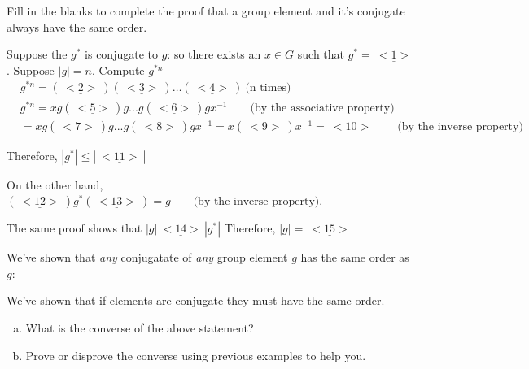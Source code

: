 \begin{exercise}\label{exercise:actions:Conj15b}
Fill in the blanks to complete the proof that a group element and it's conjugate always have the same order.

Suppose the $g^*$ is conjugate to $g$: so there exists an $x\in G$ such that $g^*=\underline{~<1>~}$. Suppose $|g|=n$. Compute $g^{*n}$
\begin{align*}
& g^{*n}=(\underline{~<2>~})(\underline{~<3>~})…(\underline{~<4>~})~\text{(n times)}\\ 
& g^{*n}=xg(\underline{~<5>~})g...g(\underline{~<6>~})gx^{-1}\qquad\text{(by the associative property)}\\
& =xg(\underline{~<7>~})g...g(\underline{~<8>~})gx^{-1}=x(\underline{~<9>~})x^{-1}=\underline{~<10>~}\qquad\text{(by the inverse property)}
\end{align*}

Therefore, $| g^*| \leq |\underline{~<11>~}|$
 
On the other hand, $(\underline{~<12>~})g^*(\underline{~<13>~})=g\qquad\text{(by the inverse property)}$.  

The same proof shows that $|g|\underline{~<14>~}|g^*|$ Therefore,  $|g|=\underline{~<15>~}$ 

We've shown that \emph{any} conjugatate of \emph{any} group element $g$ has the same order as $g$:
\end {exercise}

\begin{exercise}\label{exercise:actions:Conj15c}
We've shown that if elements are conjugate they must have the same order.
\begin {enumerate}[(a)]
\item What is the converse of the above statement?
\item Prove or disprove the converse using previous examples to help you.
\end{enumerate}
\end {exercise}
 


